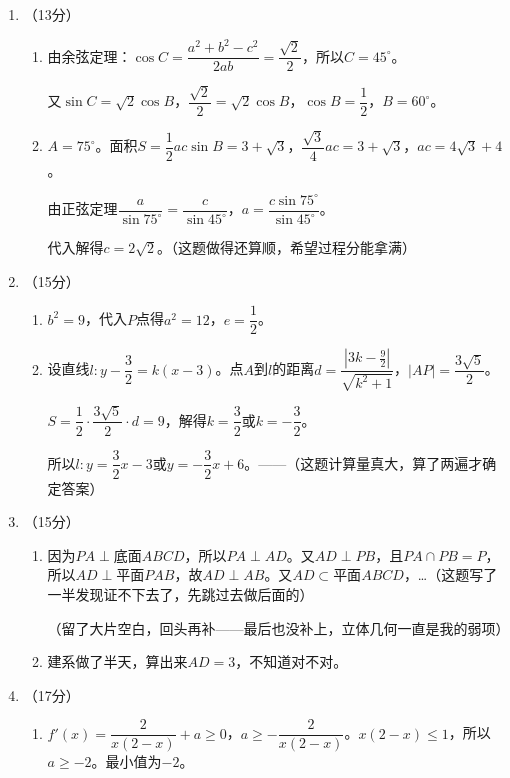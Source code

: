 \documentclass[12pt,a4paper]{article}
\begin{document}
\begin{enumerate}[label=\arabic*.]
\item （13分）
\begin{enumerate}[label=(\arabic*)]
\item 由余弦定理：$\cos C=\dfrac{a^2+b^2-c^2}{2ab}=\dfrac{\sqrt{2}}{2}$，所以$C=45^\circ$。

又$\sin C=\sqrt{2}\cos B$，$\dfrac{\sqrt{2}}{2}=\sqrt{2}\cos B$，$\cos B=\dfrac{1}{2}$，$B=60^\circ$。

\item $A=75^\circ$。面积$S=\dfrac{1}{2}ac\sin B=3+\sqrt{3}$，$\dfrac{\sqrt{3}}{4}ac=3+\sqrt{3}$，$ac=4\sqrt{3}+4$。

由正弦定理$\dfrac{a}{\sin75^\circ}=\dfrac{c}{\sin45^\circ}$，$a=\dfrac{c\sin75^\circ}{\sin45^\circ}$。

代入解得$c=2\sqrt{2}$。（这题做得还算顺，希望过程分能拿满）
\end{enumerate}

\item （15分）
\begin{enumerate}[label=(\arabic*)]
\item $b^2=9$，代入$P$点得$a^2=12$，$e=\dfrac{1}{2}$。

\item 设直线$l:y-\dfrac{3}{2}=k(x-3)$。点$A$到$l$的距离$d=\dfrac{|3k-\frac{9}{2}|}{\sqrt{k^2+1}}$，$|AP|=\dfrac{3\sqrt{5}}{2}$。

$S=\dfrac{1}{2}\cdot\dfrac{3\sqrt{5}}{2}\cdot d=9$，解得$k=\dfrac{3}{2}$或$k=-\dfrac{3}{2}$。

所以$l:y=\dfrac{3}{2}x-3$或$y=-\dfrac{3}{2}x+6$。——（这题计算量真大，算了两遍才确定答案）
\end{enumerate}

\item （15分）
\begin{enumerate}[label=(\arabic*)]
\item 因为$PA\perp$底面$ABCD$，所以$PA\perp AD$。又$AD\perp PB$，且$PA\cap PB=P$，所以$AD\perp$平面$PAB$，故$AD\perp AB$。又$AD\subset$平面$ABCD$，\dots （这题写了一半发现证不下去了，先跳过去做后面的）

（留了大片空白，回头再补——最后也没补上，立体几何一直是我的弱项）

\item 建系做了半天，算出来$AD=3$，不知道对不对。
\end{enumerate}

\item （17分）
\begin{enumerate}[label=(\arabic*)]
\item $f'(x)=\dfrac{2}{x(2-x)}+a\geqslant0$，$a\geqslant-\dfrac{2}{x(2-x)}$。$x(2-x)\leqslant1$，所以$a\geqslant-2$。最小值为$-2$。


\end{enumerate}
\end{enumerate}
\end{document}
